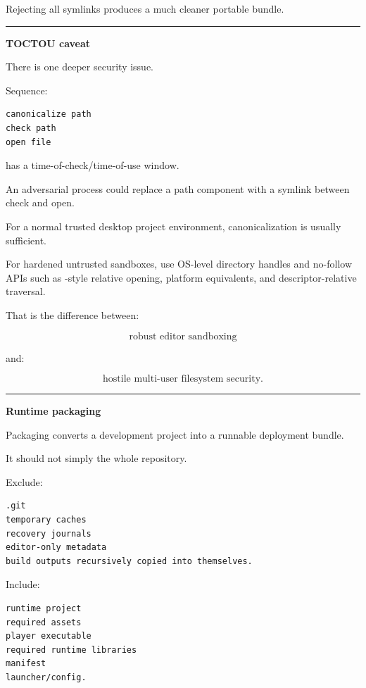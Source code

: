 Rejecting all symlinks produces a much cleaner portable bundle.

\begin{center}\rule{0.5\linewidth}{0.5pt}\end{center}

\textbf{TOCTOU caveat}

There is one deeper security issue.

Sequence:

\begin{verbatim}
canonicalize path
check path
open file
\end{verbatim}

has a time-of-check/time-of-use window.

An adversarial process could replace a path component with a symlink between check and open.

For a normal trusted desktop project environment, canonicalization is usually sufficient.

For hardened untrusted sandboxes, use OS-level directory handles and no-follow APIs such as -style relative opening, platform equivalents, and descriptor-relative traversal.

That is the difference between:

\[
\text{robust editor sandboxing}
\]

and:

\[
\text{hostile multi-user filesystem security}.
\]

\begin{center}\rule{0.5\linewidth}{0.5pt}\end{center}

\textbf{Runtime packaging}

Packaging converts a development project into a runnable deployment bundle.

It should not simply  the whole repository.

Exclude:

\begin{verbatim}
.git
temporary caches
recovery journals
editor-only metadata
build outputs recursively copied into themselves.
\end{verbatim}

Include:

\begin{verbatim}
runtime project
required assets
player executable
required runtime libraries
manifest
launcher/config.
\end{verbatim}

